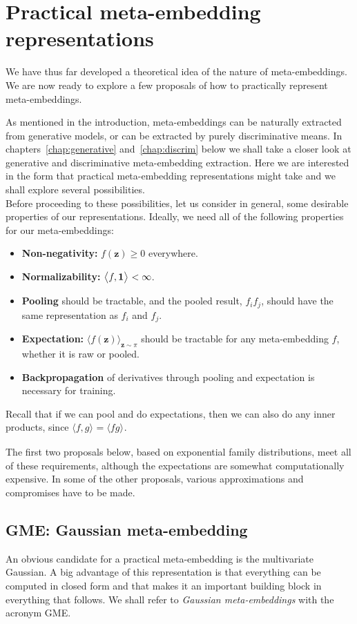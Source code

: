 \documentclass[a4paper,oneside,12pt,english]{report}
\def\zvec{\mathbf{z}}
\def\expv#1#2{\bigl\langle#1\bigr\rangle_{#2}}
\def\dot#1#2{\expv{#1,#2}{}}
\begin{document}
\chapter{Practical meta-embedding representations}
\label{chap:representations}
We have thus far developed a theoretical idea of the nature of meta-embeddings. We are now ready to explore a few proposals of how to practically represent meta-embeddings. 

As mentioned in the introduction, meta-embeddings can be naturally extracted from generative models, or can be extracted by purely discriminative means. In chapters~\ref{chap:generative} and~\ref{chap:discrim} below we shall take a closer look at generative and discriminative meta-embedding extraction. Here we are interested in the form that practical meta-embedding representations might take and we shall explore several possibilities. \\

\noindent Before proceeding to these possibilities, let us consider in general, some desirable properties of our representations. Ideally, we need all of the following properties for our meta-embeddings:
\begin{itemize}
	\item[] \textbf{Non-negativity:} $f(\zvec)\ge0$ everywhere.
	\item[] \textbf{Normalizability:} $\dot{f}{\onevec}<\infty$.
	\item[] \textbf{Pooling} should be tractable, and the pooled result, $f_if_j$, should have the same representation as $f_i$ and $f_j$.
	\item[] \textbf{Expectation:}  $\expv{f(\zvec)}{\zvec\sim\pi}$ should be tractable for any meta-embedding $f$, whether it is raw or pooled.
	\item[] \textbf{Backpropagation} of derivatives through pooling and expectation is necessary for training.
\end{itemize}
Recall that if we can pool and do expectations, then we can also do any inner products, since $\dot{f}{g}=\expv{fg}{}$.

The first two proposals below, based on exponential family distributions, meet all of these requirements, although the expectations are somewhat computationally expensive. In some of the other proposals, various approximations and compromises have to be made.



\section{GME: Gaussian meta-embedding}
\label{sec:MVG}
\def\dvec{\mathbf{d}}
An obvious candidate for a practical meta-embedding is the multivariate Gaussian. A big advantage of this representation is that everything can be computed in closed form and that makes it an important building block in everything that follows. We shall refer to \emph{Gaussian meta-embeddings} with the acronym GME.
\end{document}
